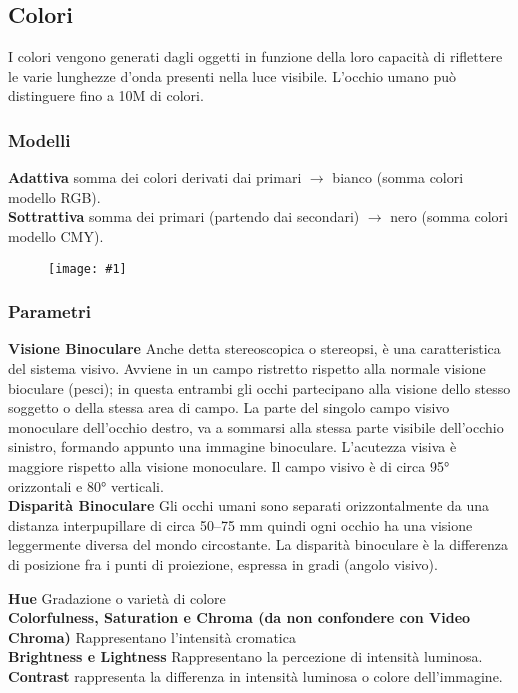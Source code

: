 \documentclass[8pt,a4paper]{article}
\newcommand{\f}[1]{
      \begin{figure}[H]
        \center
      \texttt{[image: \#1]}
      \end{figure}
}
\begin{document}
\begin{multicols}{5}
    \subsection{Colori}
    I colori vengono generati dagli oggetti in funzione della loro capacità
    di riflettere le varie lunghezze d’onda presenti nella luce visibile.
    L'occhio umano può distinguere fino a 10M di colori. \\
    \subsubsection{Modelli}
    \textbf{Adattiva} somma dei colori derivati dai primari $\rightarrow$ bianco 
    (somma colori modello RGB). \\ 
    \textbf{Sottrattiva} somma dei primari (partendo dai secondari) $\rightarrow$ nero 
    (somma colori modello CMY). \\
    \f{color-mode}
    \subsubsection{Parametri}
    \textbf{Visione Binoculare} Anche detta stereoscopica o stereopsi, è una 
    caratteristica del sistema visivo. Avviene in un campo ristretto rispetto 
    alla normale visione bioculare (pesci); in questa entrambi gli occhi partecipano 
    alla visione dello stesso soggetto o della stessa area di campo. La parte del 
    singolo campo visivo monoculare dell'occhio destro, va a sommarsi alla stessa 
    parte visibile dell'occhio sinistro, formando appunto una immagine binoculare.
    L'acutezza visiva è maggiore rispetto alla visione monoculare. Il campo visivo 
    è di circa 95° orizzontali e 80° verticali. \\
    \textbf{Disparità Binoculare} Gli occhi umani sono separati orizzontalmente da 
    una distanza interpupillare di circa 50–75 mm quindi ogni occhio ha una visione 
    leggermente diversa del mondo circostante. La disparità binoculare è la differenza 
    di posizione fra i punti di proiezione, espressa in gradi (angolo visivo).

    \textbf{Hue} Gradazione o varietà di colore\\
    \textbf{Colorfulness, Saturation e Chroma (da non confondere con Video Chroma)}
    Rappresentano l'intensità cromatica\\
    \textbf{Brightness e Lightness} Rappresentano la percezione di intensità luminosa.\\
    \textbf{Contrast} rappresenta la differenza in intensità luminosa o colore dell'immagine.

\end{multicols}
\end{document}

